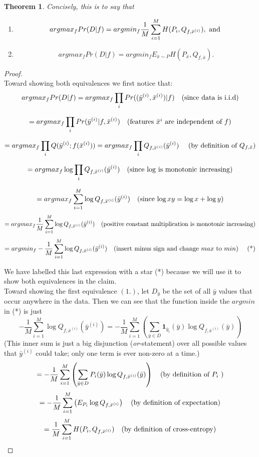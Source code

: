 \documentclass{article}
\newtheorem{theorem}{Theorem}
\begin{document}
\begin{theorem}
 Concisely, this is to say that
 
 \begin{enumerate}
 \item $$argmax_{f} Pr(D \vert f)  = argmin_{f}\frac{1}{M}\sum_{i=1}^{M} H(P_{i}, Q_{f, \bar{x}^{(i)}}), \hbox{ and }$$
\item $$argmax_{f} Pr(D \vert f)  = argmin_{f} E_{\bar{x}\sim P} H(P_{\bar{x}}, Q_{f, \bar{x}}).$$
\end{enumerate}


\end{theorem}
\bigskip
\begin{proof}~\\

Toward showing both equivalences we first notice that:\\
$$argmax_{f} Pr(D \vert f)  = argmax_{f} \prod_{i} Pr((\bar{y}^{(i)}, \bar{x}^{(i)}) \vert f ) \quad \hbox{(since data is  i.i.d)}$$

$$=argmax_{f} \prod_{i} Pr(\bar{y}^{(i)} \vert f, \bar{x}^{(i)} ) \quad \hbox{(features $\bar{x}^{i}$ are independent of  $f$)}$$
 
$$=argmax_{f} \prod_{i} Q (\bar{y}^{(i)};f(\bar{x}^{(i)}) ) =argmax_{f} \prod_{i} Q_{f, \bar{x}^{(i)}} (\bar{y}^{(i)})  \quad \hbox{ (by definition of $Q_{f, \bar{x}}$)}$$

$$=argmax_{f} \log \prod_{i} Q_{f, \bar{x}^{(i)}} (\bar{y}^{(i)})  \quad \hbox{(since $\log$ is monotonic increasing)}$$

$$=argmax_{f} \sum_{i=1}^{M} \log {Q_{f, \bar{x}^{(i)}} (\bar{y}^{(i)})} \quad \hbox{(since $\log{xy} = \log{x}+ \log{y}$)}$$
$$=argmax_{f} \frac{1}{M} \sum_{i=1}^{M} \log {Q_{f, \bar{x}^{(i)}} (\bar{y}^{(i)})} \quad \hbox{(positive constant multiplication is monotonic increasing)} $$
$$=argmin_{f} - \frac{1}{M}\sum_{i=1}^{M} \log{Q_{f, \bar{x}^{(i)}} (\bar{y}^{(i)})}  \quad \hbox{(insert minus sign and change $max$ to $min$) \quad (*)}$$

We have labelled this last expression with a star (*) because we will use it to show both equivalences in the claim. \\

Toward showing the first equivalence $(1.)$, let $D_{\bar{y}}$ be the set of all $\bar{y}$ values that occur anywhere in the data.  Then we can see that the function inside the $argmin$ in (*) is just 
$$- \frac{1}{M}\sum_{i=1}^{M} \log{Q_{f, \bar{x}^{(i)}} (\bar{y}^{(i)})} =-\frac{1}{M} \sum_{i=1}^{M} \left( \sum_{\bar{y}  \in D } \mathbf{1}_{\bar{y}_{i}}(\bar{y}) \log{Q_{f, \bar{x}^{(i)}} (\bar{y})}\right) $$
(This inner sum is just a big disjunction (\emph{or}-statement) over all possible values that $\bar{y}^{(i)}$ could take; only one term is ever non-zero at a time.)
$$=- \frac{1}{M}\sum_{i=1}^{M} \left( \sum_{\bar{y} \in D} P_{i}(\bar{y}) \log{Q_{f, \bar{x}^{(i)}} (\bar{y})}\right)  \quad \hbox{(by definition of $P_{i}$ )}$$
$$=-\frac{1}{M} \sum_{i=1}^{M} \left( E_{P_{i}} \log{Q_{f, \bar{x}^{(i)}}}\right)  \quad \hbox{(by definition of expectation)}$$
$$=\frac{1}{M}\sum_{i=1}^{M} H(P_{i}, Q_{f, \bar{x}^{(i)}})  \quad \hbox{(by definition of cross-entropy)}$$


\end{proof}
\end{document}
